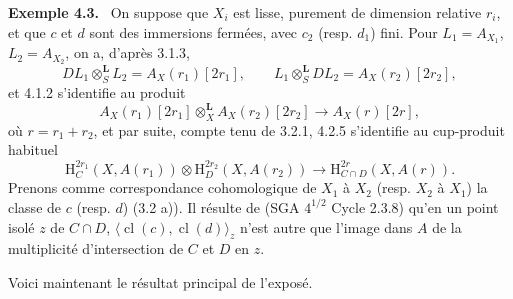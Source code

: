\documentclass[11pt]{article}
\newenvironment{statement}[1]{\par\medskip\noindent\textbf{#1.}\ }{\par\medskip}
\renewcommand{\H}{\mathrm{H}}
\providecommand{\cl}{\operatorname{cl}}
\providecommand{\cl}{\operatorname{cl}}
\providecommand{\cl}{\operatorname{cl}}
\begin{document}
\begin{statement}{Exemple 4.3}
On suppose que $X_i$ est lisse, purement de dimension relative $r_i$, et que $c$ et $d$ sont des immersions fermées, avec $c_2$ (resp. $d_1$) fini. Pour $L_1=A_{X_1}$, $L_2=A_{X_2}$, on a, d'après 3.1.3,
\[
DL_1\otimes_S^{\mathbf L}L_2=A_X(r_1)[2r_1],\qquad
L_1\otimes_S^{\mathbf L}DL_2=A_X(r_2)[2r_2],
\]
et 4.1.2 s'identifie au produit
\[
A_X(r_1)[2r_1]\otimes_X^{\mathbf L}A_X(r_2)[2r_2]\longrightarrow A_X(r)[2r],
\]
où $r=r_1+r_2$, et par suite, compte tenu de 3.2.1, 4.2.5 s'identifie au cup-produit habituel
\[
\H_C^{2r_1}(X,A(r_1))\otimes \H_D^{2r_2}(X,A(r_2))
\longrightarrow
\H_{C\cap D}^{2r}(X,A(r)).
\]
Prenons comme correspondance cohomologique de $X_1$ à $X_2$ (resp. $X_2$ à $X_1$) la classe de $c$ (resp. $d$) (3.2 a)). Il résulte de (SGA $4^{1/2}$ Cycle 2.3.8) qu'en un point isolé $z$ de $C\cap D$, $\langle \cl(c),\cl(d)\rangle_z$ n'est autre que l'image dans $A$ de la multiplicité d'intersection de $C$ et $D$ en $z$.
\end{statement}

Voici maintenant le résultat principal de l'exposé.
\end{document}
